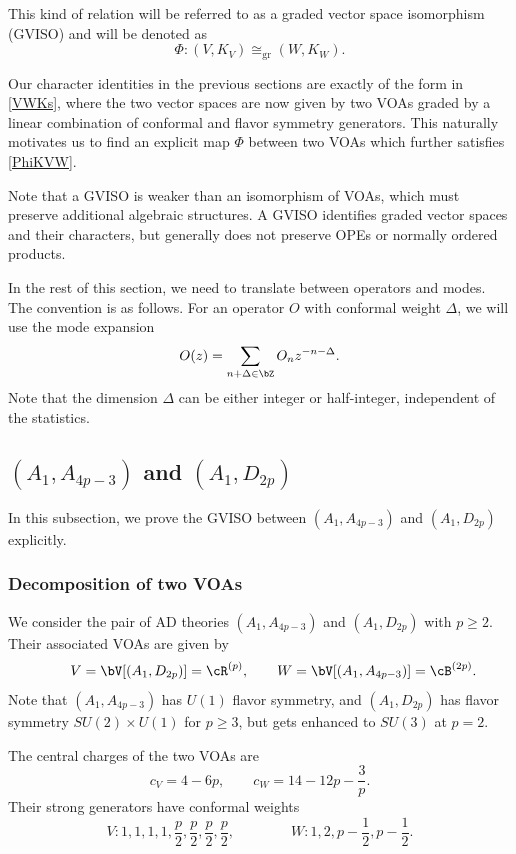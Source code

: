 \documentclass[a4paper,11pt]{article}
\theoremstyle{definition}
\theoremstyle{definition}
\theoremstyle{remark}
\newcommand{\be}{\begin{equation}}
\newcommand{\ee}{\end{equation}}
\begin{document}
 
This kind of relation will be referred to as a graded vector space isomorphism (GVISO) and will be denoted as
\be
\Phi: (V,  K_V)\cong_\text{gr}(W,  K_W).
\ee
 


 Our character identities in the previous sections are exactly of the form in \eqref{VWKs}, where the two vector spaces are now given by  two VOAs graded by  a linear combination of conformal and flavor symmetry generators. This naturally motivates us to find an explicit map $\Phi$  between two VOAs which further  satisfies  \eqref{PhiKVW}. 
 
 Note that a GVISO is weaker than an isomorphism of VOAs, which must preserve additional algebraic structures. A GVISO identifies graded vector spaces and their characters, but
generally does not preserve OPEs or normally ordered products.    
 

 
 In the rest of this section, we need to translate between operators and modes. The convention is as follows. 
For an operator $O$ with conformal weight $\Delta$, we will use the mode expansion 
\be\label{modExpO}
O(z)=\sum_{n +\Delta  \in \bZ } O_n z^{-n-\Delta}.
\ee
Note that the dimension $\Delta$ can be either integer or half-integer,   independent of the statistics. 

  

\subsection{$(A_1,A_{4p-3})$ and $(A_1,D_{2p})$}\label{GVISOAAD}

In this subsection, we prove the GVISO between $(A_1,A_{4p-3})$ and $(A_1,D_{2p})$ explicitly. 
 
\subsubsection{Decomposition of two VOAs}

We consider the pair of AD theories $(A_1,A_{4p-3})$ and $(A_1,D_{2p})$ with $p\ge 2$.  Their associated VOAs are given by \cite{Creutzig:2017qyf,Adamovic:2020lvj} 
\be \label{VWADs}
\qquad V=\bV[(A_1,D_{2p})]=\cR ^{(p)},\qquad W=\bV[(A_1,A_{4p-3})]=\cB^{(2p)}.
\ee
Note that $(A_1,A_{4p-3})$ has  $U(1)$ flavor symmetry, and $(A_1,D_{2p})$ has flavor symmetry   $SU(2)\times U(1)$ for $p\ge 3$, but gets enhanced to $SU(3)$ at $p=2$.
 
 The central charges of the two VOAs are  
  \be
 c_V=4 - 6p, \qquad c_W=14 - 12p - \frac{3}{p}.
 \ee
 Their strong generators have conformal weights  
 \be
 V: 1, 1, 1, 1, \frac{p}{2}, \frac{p}{2},\frac{p}{2},\frac{p}{2},\qquad  \qquad W: 1, 2, p-\frac12, p-\frac12.
 \ee
\end{document}

